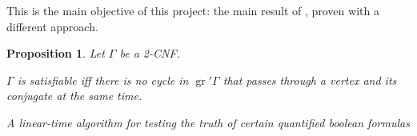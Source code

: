 \documentclass[11pt]{article}
\DeclareMathOperator{\gr}{gr}
\newtheorem{prop}{Proposition}
\begin{document}
This is the main objective of this project: the main result of \cite{2cnf}, proven with a different approach.

\begin{prop}
Let $\Gamma$ be a 2-CNF.

$\Gamma$ is satisfiable iff there is no cycle in $\gr' \Gamma$ that passes through a vertex and its conjugate at the same time.
\end{prop}


\begin{thebibliography}{1}

\textit{A linear-time algorithm for testing the truth of certain quantified boolean formulas}

\end{thebibliography}
\end{document}
